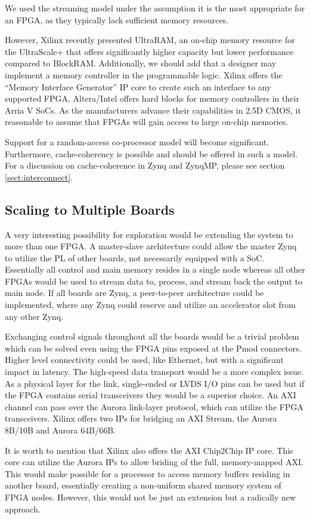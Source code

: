 We used the streaming model under the assumption it is the most appropriate for an FPGA, 
as they typically lack sufficient memory resources.

However, Xilinx recently presented UltraRAM, an on-chip memory resource for the UltraScale+
that offers significantly higher capacity but lower performance compared to BlockRAM. 
Additionally, we should add that a designer may implement a memory controller in the programmable logic.
Xilinx offers the ``Memory Interface Generator'' IP core to create such an interface to any supported FPGA.
Altera/Intel offers hard blocks for memory controllers in their Arria V SoCs.
As the manufacturers advance their capabilities in 2.5D CMOS, it reasonable to assume that FPGAs will
gain access to large on-chip memories. 

Support for a random-access co-processor model will become significant. 
Furthermore, cache-coherency is possible and should be offered in such a model. 
For a discussion on cache-coherence in Zynq and ZynqMP, please see section \ref{sect:interconnect}.

\subsection{Scaling to Multiple Boards}

A very interesting possibility for exploration would be extending the system to more than one FPGA.
A master-slave architecture could allow the master Zynq to utilize the PL of other boards, not necessarily equipped with a SoC.
Essentially all control and main memory resides in a single node whereas all other FPGAs would be used to stream data to, process,
and stream back the output to main node.
If all boards are Zynq, a peer-to-peer architecture could be implemented, where any Zynq could reserve and utilize an accelerator
slot from any other Zynq.

Exchanging control signals throughout all the boards would be a trivial problem which can be solved even using the FPGA pins exposed at
the Pmod connectors. Higher level connectivity could be used, like Ethernet, but with a significant impact in latency.
The high-speed data transport would be a more complex issue. As a physical layer for the link, single-ended or LVDS I/O pins can be used
but if the FPGA contains serial transceivers they would be a superior choice. An AXI channel can pass over the Aurora link-layer protocol,
which can utilize the FPGA transceivers. Xilinx offers two IPs for bridging an AXI Stream, the Aurora 8B/10B and Aurora 64B/66B.

It is worth to mention that Xilinx also offers the AXI Chip2Chip IP core. This core can utilize the Aurora IPs
to allow briding of the full, memory-mapped AXI. 
This would make possible for a processor to access memory buffers residing in another board, essentially creating a non-uniform 
shared memory system of FPGA nodes. However, this would not be just an extension but a radically new approach.

